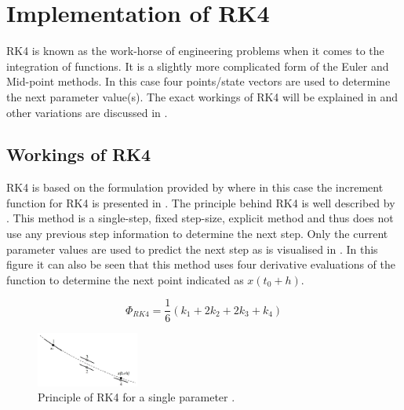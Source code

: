 


\section{Implementation of \ac{RK4}}
\label{sec:impothmeth}
\ac{RK4} is known as the work-horse of engineering problems when it comes to the integration of functions. It is a slightly more complicated form of the Euler and Mid-point methods. In this case four points/state vectors are used to determine the next parameter value(s). The exact workings of \ac{RK4} will be explained in  and other variations are discussed in .



\subsection{Workings of \ac{RK4}}
\label{subsec:work_rk4}
\ac{RK4} is based on the formulation provided by  where in this case the increment function for \ac{RK4} is presented in . The principle behind \ac{RK4} is well described by \cite{noomen2013int}. This method is a single-step, fixed step-size, explicit method and thus does not use any previous step information to determine the next step. Only the current parameter values are used to predict the next step as is visualised in . In this figure it can also be seen that this method uses four derivative evaluations of the function to determine the next point indicated as $x\left(t_{0}+h\right)$. 


\begin{equation} \label{eq:rk4_increment}
\Phi_{RK4}=\dfrac{1}{6}\left(k_{1}+2k_{2}+2k_{3}+k_{4}\right)
\end{equation}


\begin{figure}[!ht]
\centering
\includegraphics[width=0.3\textwidth]{figures/integrators/rk4_noomen2013int.jpg}
\caption{Principle of \ac{RK4} for a single parameter \cite{noomen2013int}.}
\label{fig:rk4_noomen2013int}
\end{figure}

